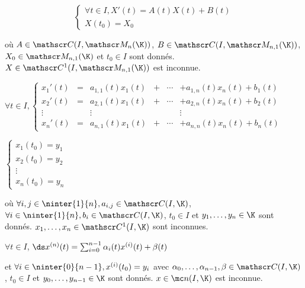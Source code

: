 
\svspace $$\begin{cases}
    \forall t \in I, X'(t) = A(t) X(t) + B(t) \\
    X(t_0) = X_0
\end{cases}$$

où $A \in \mathscr C(I, \mathscr M_n(\K))$, $B \in \mathscr C(I, \mathscr M_{n,1}(\K))$,
$X_0 \in \mathscr M_{n,1}(\K)$ et $t_0 \in I$ sont donnés. $X \in \mathscr C^1(I, \mathscr M_{n,1}(\K))$ est inconnue.


\svspace $\forall t \in I, \left\{ \begin{array}{lccccc}
    x_1'(t) & = & a_{1,1}(t)x_1(t) & + & \cdots & + a_{1,n}(t)x_n(t) + b_1(t) \\
    x_2'(t) & = & a_{2,1}(t)x_1(t) & + & \cdots & + a_{2,n}(t)x_n(t) + b_2(t) \\
    \vdots & & \vdots & & & \vdots \\
    x_n'(t) & = & a_{n,1}(t)x_1(t) & + & \cdots & + a_{n,n}(t)x_n(t) + b_n(t)
\end{array} \right.$

$\begin{cases}
    x_1(t_0) = y_1 \\
    x_2(t_0) = y_2 \\
    \vdots \\
    x_n(t_0) = y_n
\end{cases}$

où $\forall i, j \in \ninter{1}{n}, a_{i,j} \in \mathscr C(I, \K)$, $\forall i \in \ninter{1}{n}, b_i \in \mathscr C(I, \K)$,
$t_0 \in I$ et $y_1, \dots, y_n \in \K$ sont donnés. $x_1, \dots, x_n \in \mathscr C^1(I, \K)$ sont inconnues.


\svspace $\forall t \in I$, 
$\ds x^{(n)}(t) = \sum_{i = 0}^{n - 1} \alpha_i(t) x^{(i)}(t) + \beta(t)$

et $\forall i \in \ninter {0}{n - 1}, x^{(i)}(t_0) = y_i$ avec 
$\alpha_0, \dots, \alpha_{n-1}, \beta \in \mathscr C(I, \K)$, $t_0 \in I$ et $y_0, \dots, y_{n-1} \in \K$ sont donnés. $x \in \mc n (I, \K)$ est inconnue.

